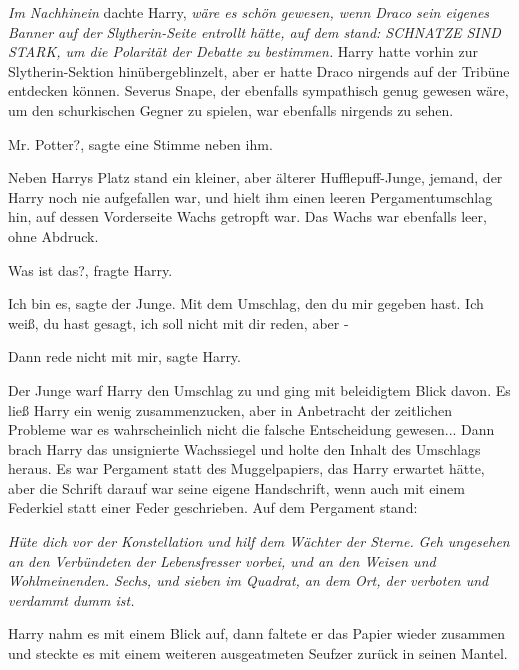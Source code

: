 \emph{Im Nachhinein} dachte Harry, \emph{wäre es schön gewesen, wenn Draco sein
eigenes Banner auf der Slytherin-Seite entrollt hätte, auf dem stand: \glqq{}
SCHNATZE SIND STARK\grqq{}, um die Polarität der Debatte zu bestimmen.} Harry
hatte vorhin zur Slytherin-Sektion hinübergeblinzelt, aber er hatte Draco
nirgends auf der Tribüne entdecken können. Severus Snape, der ebenfalls
sympathisch genug gewesen wäre, um den schurkischen Gegner zu spielen, war
ebenfalls nirgends zu sehen.

\glqq{}Mr. Potter?\grqq{}, sagte eine Stimme neben ihm.

Neben Harrys Platz stand ein kleiner, aber älterer Hufflepuff-Junge, jemand, der
Harry noch nie aufgefallen war, und hielt ihm einen leeren Pergamentumschlag
hin, auf dessen Vorderseite Wachs getropft war. Das Wachs war ebenfalls leer,
ohne Abdruck.

\glqq{}Was ist das?\grqq{}, fragte Harry.

\glqq{}Ich bin es\grqq{}, sagte der Junge. \glqq{}Mit dem Umschlag, den du mir
gegeben hast. Ich weiß, du hast gesagt, ich soll nicht mit dir reden, aber -\grqq{}

\glqq{}Dann rede nicht mit mir\grqq{}, sagte Harry.

Der Junge warf Harry den Umschlag zu und ging mit beleidigtem Blick davon. Es
ließ Harry ein wenig zusammenzucken, aber in Anbetracht der zeitlichen Probleme
war es wahrscheinlich nicht die falsche Entscheidung gewesen... Dann brach Harry
das unsignierte Wachssiegel und holte den Inhalt des Umschlags heraus. Es war
Pergament statt des Muggelpapiers, das Harry erwartet hätte, aber die Schrift
darauf war seine eigene Handschrift, wenn auch mit einem Federkiel statt einer
Feder geschrieben. Auf dem Pergament stand:

\emph{Hüte dich vor der Konstellation und hilf dem Wächter der Sterne.}
\emph{Geh ungesehen an den Verbündeten der Lebensfresser vorbei, und an den
Weisen und Wohlmeinenden. Sechs, und sieben im Quadrat, an dem Ort, der verboten
und verdammt dumm ist.}

Harry nahm es mit einem Blick auf, dann faltete er das Papier wieder zusammen
und steckte es mit einem weiteren ausgeatmeten Seufzer zurück in seinen Mantel.


